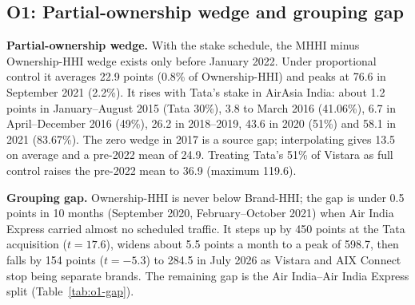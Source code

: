 \documentclass[12pt,a4paper]{article}
\newif\ifoneon
\newcommand{\oneHL}{\par\oneontrue\color{orange}\captionsetup{font+={color=blue}}}
\begin{document}
{\oneHL \subsection{O1: Partial-ownership wedge and grouping gap}
\label{app:o1-wedge}
\textbf{Partial-ownership wedge.} With the stake schedule, the MHHI minus Ownership-HHI wedge exists only before January 2022. Under proportional control it averages 22.9 points (0.8\% of Ownership-HHI) and peaks at 76.6 in September 2021 (2.2\%). It rises with Tata's stake in AirAsia India: about 1.2 points in January--August 2015 (Tata 30\%), 3.8 to March 2016 (41.06\%), 6.7 in April--December 2016 (49\%), 26.2 in 2018--2019, 43.6 in 2020 (51\%) and 58.1 in 2021 (83.67\%). The zero wedge in 2017 is a source gap; interpolating gives 13.5 on average and a pre-2022 mean of 24.9. Treating Tata's 51\% of Vistara as full control raises the pre-2022 mean to 36.9 (maximum 119.6).

\textbf{Grouping gap.} Ownership-HHI is never below Brand-HHI; the gap is under 0.5 points in 10 months (September 2020, February--October 2021) when Air India Express carried almost no scheduled traffic. It steps up by 450 points at the Tata acquisition ($t=17.6$), widens about 5.5 points a month to a peak of 598.7, then falls by 154 points ($t=-5.3$) to 284.5 in July 2026 as Vistara and AIX Connect stop being separate brands. The remaining gap is the Air India--Air India Express split (Table~\ref{tab:o1-gap}).

}
\end{document}
